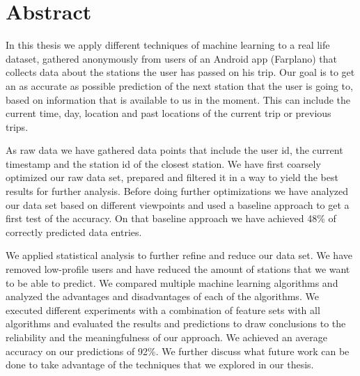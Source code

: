 \newpage
\section{Abstract}

In this thesis we apply different techniques of machine learning to a real life dataset, gathered anonymously from users of an Android app (Farplano) that collects data about the stations the user has passed on his trip. Our goal is to get an as accurate as possible prediction of the next station that the user is going to, based on information that is available to us in the moment. This can include the current time, day, location and past locations of the current trip or previous trips.

As raw data we have gathered data points that include the user id, the current timestamp and the station id of the closest station. We have first coarsely optimized our raw data set, prepared and filtered it in a way to yield the best results for further analysis. Before doing further optimizations we have analyzed our data set based on different viewpoints and used a baseline approach to get a first test of the accuracy. On that baseline approach we have achieved 48\% of correctly predicted data entries.

We applied statistical analysis to further refine and reduce our data set. We have removed low-profile users and have reduced the amount of stations that we want to be able to predict. We compared multiple machine learning algorithms and analyzed the advantages and disadvantages of each of the algorithms. We executed different experiments with a combination of feature sets with all algorithms and evaluated the results and predictions to draw conclusions to the reliability and the meaningfulness of our approach. We achieved an average accuracy on our predictions of 92\%. We further discuss what future work can be done to take advantage of the techniques that we explored in our thesis.
